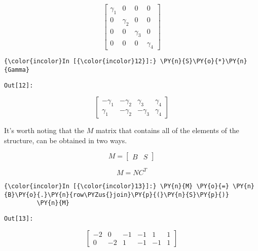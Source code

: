         \begin{equation*}
        \left[\begin{matrix}\gamma_{1} & 0 & 0 & 0\\0 & \gamma_{2} & 0 & 0\\0 & 0 & \gamma_{3} & 0\\0 & 0 & 0 & \gamma_{4}\end{matrix}\right]
        \end{equation*}



    \begin{Verbatim}[commandchars=\\\{\}]
{\color{incolor}In [{\color{incolor}12}]:} \PY{n}{S}\PY{o}{*}\PY{n}{Gamma}
\end{Verbatim}
\texttt{\color{outcolor}Out[{\color{outcolor}12}]:}


        \begin{equation*}
        \left[\begin{matrix}- \gamma_{1} & - \gamma_{2} & \gamma_{3} & \gamma_{4}\\\gamma_{1} & - \gamma_{2} & - \gamma_{3} & \gamma_{4}\end{matrix}\right]
        \end{equation*}



    It's worth noting that the \(M\) matrix that contains all of the
elements of the structure, can be obtained in two ways.

\[
M = \begin{bmatrix} B & S \end{bmatrix}
\]

\[
M = N C^T
\]

    \begin{Verbatim}[commandchars=\\\{\}]
{\color{incolor}In [{\color{incolor}13}]:} \PY{n}{M} \PY{o}{=} \PY{n}{B}\PY{o}{.}\PY{n}{row\PYZus{}join}\PY{p}{(}\PY{n}{S}\PY{p}{)}
         \PY{n}{M}
\end{Verbatim}
\texttt{\color{outcolor}Out[{\color{outcolor}13}]:}


        \begin{equation*}
        \left[\begin{matrix}-2 & 0 & -1 & -1 & 1 & 1\\0 & -2 & 1 & -1 & -1 & 1\end{matrix}\right]
        \end{equation*}



